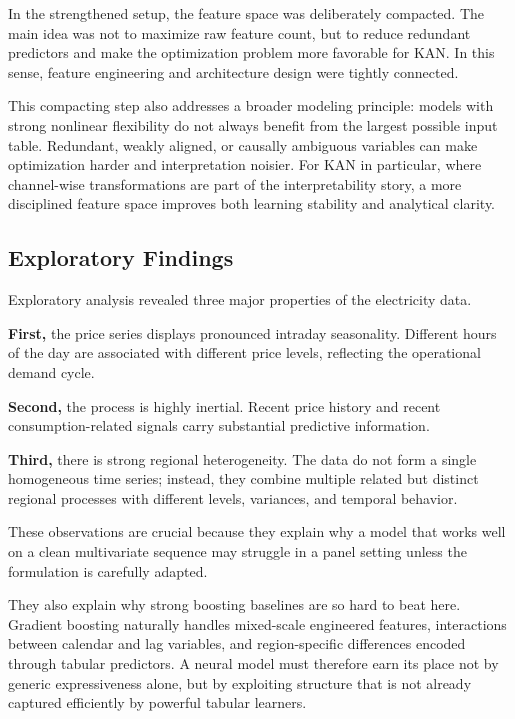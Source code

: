 \documentclass[10pt,conference,onecolumn]{IEEEtran}
\begin{document}
In the strengthened setup, the feature space was deliberately compacted. The main idea was not to maximize raw feature count, but to reduce redundant predictors and make the optimization problem more favorable for KAN. In this sense, feature engineering and architecture design were tightly connected.

This compacting step also addresses a broader modeling principle: models with strong nonlinear flexibility do not always benefit from the largest possible input table. Redundant, weakly aligned, or causally ambiguous variables can make optimization harder and interpretation noisier. For KAN in particular, where channel-wise transformations are part of the interpretability story, a more disciplined feature space improves both learning stability and analytical clarity.

\subsection{Exploratory Findings}

Exploratory analysis revealed three major properties of the electricity data.

\textbf{First,} the price series displays pronounced intraday seasonality. Different hours of the day are associated with different price levels, reflecting the operational demand cycle.

\textbf{Second,} the process is highly inertial. Recent price history and recent consumption-related signals carry substantial predictive information.

\textbf{Third,} there is strong regional heterogeneity. The data do not form a single homogeneous time series; instead, they combine multiple related but distinct regional processes with different levels, variances, and temporal behavior.

These observations are crucial because they explain why a model that works well on a clean multivariate sequence may struggle in a panel setting unless the formulation is carefully adapted.

They also explain why strong boosting baselines are so hard to beat here. Gradient boosting naturally handles mixed-scale engineered features, interactions between calendar and lag variables, and region-specific differences encoded through tabular predictors. A neural model must therefore earn its place not by generic expressiveness alone, but by exploiting structure that is not already captured efficiently by powerful tabular learners.
\end{document}
